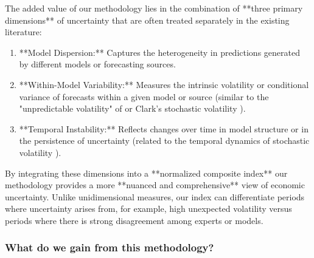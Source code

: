 \documentclass[5p,authoryear]{elsarticle}
\begin{document}
The added value of our methodology lies in the combination of **three primary dimensions** of uncertainty that are often treated separately in the existing literature:
\begin{enumerate}
    \item **Model Dispersion:** Captures the heterogeneity in predictions generated by different models or forecasting sources.
    \item **Within-Model Variability:** Measures the intrinsic volatility or conditional variance of forecasts within a given model or source (similar to the "unpredictable volatility" of \cite{jurado2015} or Clark's stochastic volatility \cite{clark2017}).
    \item **Temporal Instability:** Reflects changes over time in model structure or in the persistence of uncertainty (related to the temporal dynamics of stochastic volatility \cite{clark2017}).
\end{enumerate}

By integrating these dimensions into a **normalized composite index** our methodology provides a more **nuanced and comprehensive** view of economic uncertainty. Unlike unidimensional measures, our index can differentiate periods where uncertainty arises from, for example, high unexpected volatility versus periods where there is strong disagreement among experts or models.

\subsubsection*{What do we gain from this methodology?}
\end{document}
